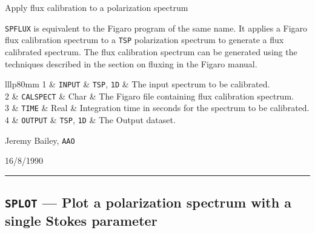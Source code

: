 \documentclass[11pt,twoside]{article}
\makeatletter
\renewcommand{\_}{\texttt{\symbol{95}}}
\newcommand{\manrule}{\rule{\textwidth}{0.5mm}}
\newcommand{\manroutine}[3]{\subsection{#1 --- #2}}
\newenvironment{manroutinedescription}{\begin{description}}{\end{description}%
\manrule}
\newcommand{\manroutineitem}[2]{\item[#1:] #2\mbox{}}
\newcommand{\manparametercols}{lllp{80mm}}
\newcommand{\manparameterorder}[3]{#1 & #2 & #3 & }
\newcommand{\manparametertop}{}
\newcommand{\manparameterbottom}{}
\newenvironment{manparametertable}{\gdef\manparameter@ss{}%
\gdef\manparameter@hl{}\hspace*{\fill}\vspace*{-\partopsep}\begin{trivlist}%
\item[]\begin{tabular}{\manparametercols}\manparametertop}{\manparameterbottom%
\end{tabular}\end{trivlist}}
\newcommand{\manparameterentry}[3]{\manparameter@ss\gdef\manparameter@ss{\\}%
\gdef\manparameter@hl{\hline}\manparameterorder{#1}{#2}{#3}}
\newcommand{\mantt}{\tt}
\makeatother
\begin{document}
\begin{manroutinedescription}
\manroutineitem{Function}{}
        Apply flux calibration to a polarization spectrum

\manroutineitem{Description}{}
        {\mantt{SPFLUX}} is equivalent to the Figaro program of the same name.
        It applies a Figaro flux calibration spectrum to a {\mantt{TSP}}
        polarization spectrum to generate a flux calibrated spectrum.
        The flux calibration spectrum can be generated using the techniques
        described in the section on fluxing in the Figaro manual.

\manroutineitem{Parameters}{}
\begin{manparametertable}
\manparameterentry{1}{{\mantt{INPUT}}}{{\mantt{TSP}}, {\mantt{1D}}}  The input %
spectrum to be calibrated.
\manparameterentry{2}{{\mantt{CALSPECT}}}{Char}     The Figaro file containing %
flux calibration
                               spectrum.
\manparameterentry{3}{{\mantt{TIME}}}{Real}     Integration time in seconds %
for the
                               spectrum to be calibrated.
\manparameterentry{4}{{\mantt{OUTPUT}}}{{\mantt{TSP}}, {\mantt{1D}}}  The %
Output dataset.

\end{manparametertable}
\manroutineitem{Support}{}
         Jeremy Bailey, {\mantt{AAO}}

\manroutineitem{Version date}{}
         16/8/1990

\end{manroutinedescription}
\manroutine{{\mantt{SPLOT}}}{Plot a polarization spectrum with a single Stokes %
parameter}{SPLOT}
\end{document}
